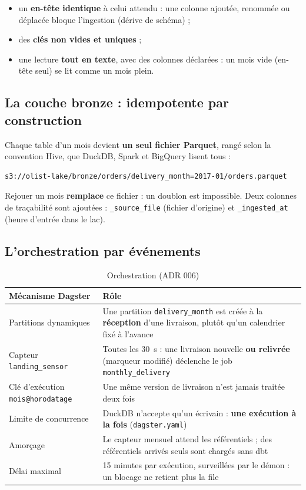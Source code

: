 \documentclass[11pt, a4paper, oneside, headings=normal, numbers=noenddot, DIV=12]{scrartcl}
\begin{document}
\begin{itemize}[leftmargin=1.2em]
  \item un \textbf{en-tête identique} à celui attendu : une colonne ajoutée, renommée ou déplacée bloque l'ingestion (dérive de schéma) ;
  \item des \textbf{clés non vides et uniques} ;
  \item une lecture \textbf{tout en texte}, avec des colonnes déclarées : un mois vide (en-tête seul) se lit comme un mois plein.
\end{itemize}

\subsection{La couche bronze : idempotente par construction}
Chaque table d'un mois devient \textbf{un seul fichier Parquet}, rangé selon la convention Hive, que DuckDB, Spark et BigQuery lisent tous :

\begin{lstlisting}[language={}]
s3://olist-lake/bronze/orders/delivery_month=2017-01/orders.parquet
\end{lstlisting}

Rejouer un mois \textbf{remplace} ce fichier : un doublon est impossible. Deux colonnes de traçabilité sont ajoutées :
\texttt{\_source\_file} (fichier d'origine) et \texttt{\_ingested\_at} (heure d'entrée dans le lac).

\subsection{L'orchestration par événements}
\begin{table}[H]
\centering\small
\begin{tabularx}{\linewidth}{@{}L{3.6cm} Y@{}}
\toprule
\textbf{Mécanisme Dagster} & \textbf{Rôle} \\
\midrule
Partitions dynamiques & Une partition \texttt{delivery\_month} est créée à la \textbf{réception} d'une livraison, plutôt qu'un calendrier fixé à l'avance \\
Capteur \texttt{landing\_sensor} & Toutes les 30~s : une livraison nouvelle \textbf{ou relivrée} (marqueur modifié) déclenche le job \texttt{monthly\_delivery} \\
Clé d'exécution \texttt{mois@horodatage} & Une même version de livraison n'est jamais traitée deux fois \\
Limite de concurrence & DuckDB n'accepte qu'un écrivain : \textbf{une exécution à la fois} (\texttt{dagster.yaml}) \\
Amorçage & Le capteur mensuel attend les référentiels ; des référentiels arrivés seuls sont chargés sans dbt \\
Délai maximal & 15 minutes par exécution, surveillées par le démon : un blocage ne retient plus la file \\
\bottomrule
\end{tabularx}
\caption{Orchestration (ADR 006)}
\end{table}
\end{document}
